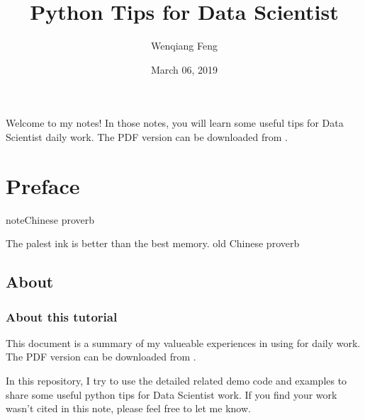 \documentclass[letterpaper,12pt,english]{sphinxmanual}
\title{Python Tips for Data Scientist}
\date{March 06, 2019}
\author{Wenqiang Feng}
\begin{document}
\pagestyle{empty}
\sphinxmaketitle
\pagestyle{plain}
\sphinxtableofcontents
\pagestyle{normal}
\label{\detokenize{index::doc}}\begin{quote}

\begin{figure}[htbp]
\centering

\noindent{}
\end{figure}
\end{quote}

Welcome to my  notes! In those notes, you will learn some useful tips for Data Scientist daily work. The PDF version can be downloaded from .




\chapter{Preface}
\label{\detokenize{preface:preface}}\label{\detokenize{preface:id1}}\label{\detokenize{preface::doc}}
\begin{sphinxadmonition}{note}{Chinese proverb}

The palest ink is better than the best memory. \textendash{} old Chinese proverb
\end{sphinxadmonition}


\section{About}
\label{\detokenize{preface:about}}

\subsection{About this tutorial}
\label{\detokenize{preface:about-this-tutorial}}
This document is a summary of my valueable experiences in using  for  daily work. The PDF version can be downloaded from . 

In this repository, I try to use the detailed  related demo code and
examples to share some useful python tips for Data Scientist work. If you find your work wasn’t cited in this note, please feel free to let me know.
\end{document}

